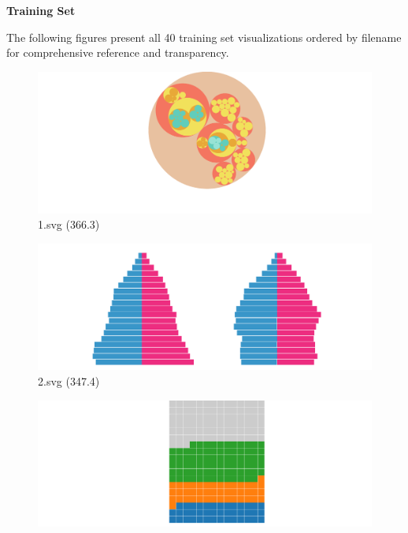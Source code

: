 \documentclass[journal]{IEEEtran}
\begin{document}
\clearpage

\textbf{Training Set}

The following figures present all 40 training set visualizations ordered by filename for comprehensive reference and transparency.


\vspace{1em}

\begin{figure}[!htbp]
\centering
\begin{minipage}{0.233\columnwidth}
\centering
\includegraphics[width=\textwidth]{Train_set/1.pdf}
{1.svg (366.3)}
\end{minipage}
\hfill
\begin{minipage}{0.233\columnwidth}
\centering
\includegraphics[width=\textwidth]{Train_set/2.pdf}
{2.svg (347.4)}
\end{minipage}
\hfill
\begin{minipage}{0.233\columnwidth}
\centering
\includegraphics[width=\textwidth]{Train_set/3.pdf}

\end{minipage}
\end{figure}
\end{document}
